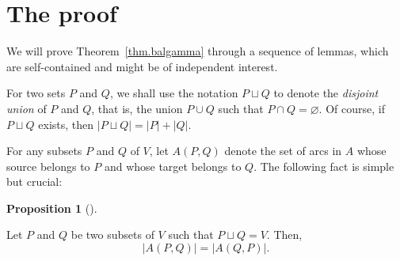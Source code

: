\documentclass[numbers=enddot,12pt,final,onecolumn,notitlepage]{scrartcl}%
\theoremstyle{definition}
\newtheorem{prop}[theo]{Proposition}
\newenvironment{proposition}[1][]
{\begin{prop}[#1]\begin{leftbar}}
{\end{leftbar}\end{prop}}
\theoremstyle{plainsl}
\begin{document}
\section{The proof}

We will prove Theorem~\ref{thm.balgamma} through a sequence of lemmas, which
are self-contained and might be of independent interest.

For two sets $P$ and $Q$, we shall use the notation $P \sqcup Q$ to denote the
\textit{disjoint union} of $P$ and $Q$, that is, the union $P \cup Q$ such
that $P \cap Q = \varnothing$. Of course, if $P \sqcup Q$ exists, then $|P
\sqcup Q| =|P|+|Q|$.

For any subsets $P$ and $Q$ of $V$, let $A(P,Q)$ denote the set of arcs in $A$
whose source belongs to $P$ and whose target belongs to $Q$. The following
fact is simple but crucial:

\begin{proposition}
\label{prop.A-symmetry}Let $P$ and $Q$ be two subsets of $V$ such that
$P\sqcup Q=V$. Then,
\[
\left\vert A\left(  P,Q\right)  \right\vert =\left\vert A\left(  Q,P\right)
\right\vert .
\]

\end{proposition}
\end{document}
